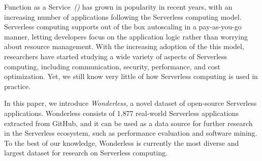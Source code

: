 %
%
Function as a Service~\emph{(\faas)} has grown in popularity in recent years, 
with an increasing number of applications following the Serverless computing model. 
Serverless computing supports out of the box autoscaling in a pay-as-you-go manner, 
letting developers focus on the application logic rather than worrying 
about resource management. 
%
With the increasing adoption of the this model, researchers have started 
studying a wide variety of aspects of Serverless computing, 
including communication, security, performance, and cost optimization. 
Yet, we still know very little of how Serverless computing is used in practice.

In this paper, we introduce \emph{Wonderless}, a novel dataset
of open-source Serverless applications. 
Wonderless consists of 1,877 real-world Serverless applications 
extracted from GitHub, and it can be used as a data source for 
further research in the Serverless ecosystem, such as performance 
evaluation and software mining. To the best of our knowledge, 
Wonderless is currently the most diverse and largest dataset 
for research on Serverless computing.


